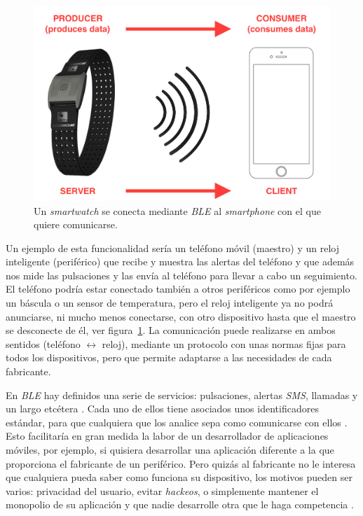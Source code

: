 \begin{figure}[tbp]
\centering
\includegraphics[scale=0.15]{figures/communication-ble.png}
\caption{Un \textit{smartwatch} se conecta mediante \textit{BLE} al \textit{smartphone} con el que quiere comunicarse.\label{fig:communication-ble}}
\end{figure}

Un ejemplo de esta funcionalidad sería un teléfono móvil (maestro) y un reloj inteligente (periférico) que recibe y muestra las alertas del teléfono y que además nos mide las pulsaciones y las envía al teléfono para llevar a cabo un seguimiento. El teléfono podría estar conectado también a otros periféricos como por ejemplo un báscula o un sensor de temperatura, pero el reloj inteligente ya no podrá anunciarse, ni mucho menos conectarse, con otro dispositivo hasta que el maestro se desconecte de él, ver figura~\ref{fig:communication-ble}. La comunicación puede realizarse en ambos sentidos (teléfono ${\leftrightarrow}$ reloj), mediante un protocolo con unas normas fijas para todos los dispositivos, pero que permite adaptarse a las necesidades de cada fabricante.

En \textit{BLE} hay definidos una serie de servicios: pulsaciones, alertas \textit{SMS}, llamadas y un largo etcétera . Cada uno de ellos tiene asociados unos identificadores estándar, para que cualquiera que los analice sepa como comunicarse con ellos \cite{noauthor_ble_nodate}. Esto facilitaría en gran medida la labor de un desarrollador de aplicaciones móviles, por ejemplo, si quisiera desarrollar una aplicación diferente a la que proporciona el fabricante de un periférico. Pero quizás al fabricante no le interesa que cualquiera pueda saber como funciona su dispositivo, los motivos pueden ser varios: privacidad del usuario, evitar \textit{hackeos}, o simplemente mantener el monopolio de su aplicación y que nadie desarrolle otra que le haga competencia \cite{andrey_nikishaev_how_nodate}.

